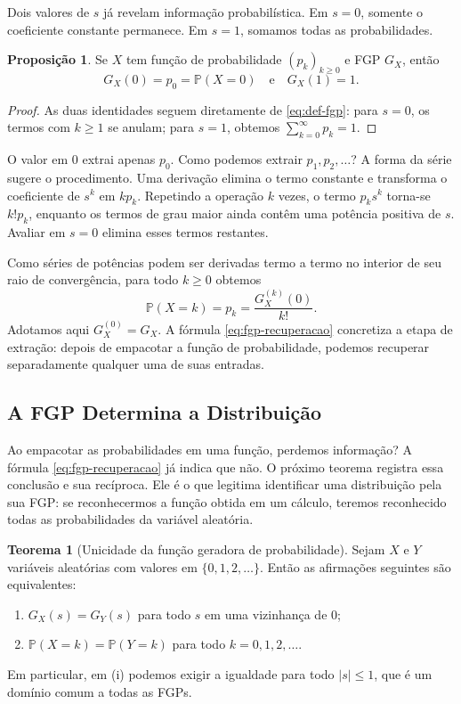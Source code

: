 \documentclass[12pt,portuguese]{article}
\theoremstyle{definition}
\newtheorem{theorem}{Teorema}
\newtheorem{proposition}[proposition]{Proposição}
\theoremstyle{plainexercise}
\theoremstyle{starredexercise}
\theoremstyle{definition}
\begin{document}
Dois valores de $s$ já revelam informação probabilística. Em $s=0$, somente
o coeficiente constante permanece. Em $s=1$, somamos todas as probabilidades.

\begin{proposition}\label{prop:propriedades-basicas-fgp}
Se $X$ tem função de probabilidade $(p_k)_{k\geqslant 0}$ e FGP $G_X$, então
\[
G_X(0)=p_0=\mathbb{P}(X=0)
\quad\text{e}\quad
G_X(1)=1.
\]
\end{proposition}

\begin{proof}
As duas identidades seguem diretamente de \eqref{eq:def-fgp}: para $s=0$,
os termos com $k\geqslant 1$ se anulam; para $s=1$, obtemos
$\sum_{k=0}^{\infty}p_k=1$.
\end{proof}

O valor em $0$ extrai apenas $p_0$. Como podemos extrair $p_1,p_2,\ldots$?
A forma da série sugere o procedimento. Uma derivação elimina o termo
constante e transforma o coeficiente de $s^k$ em $k p_k$. Repetindo a
operação $k$ vezes, o termo $p_k s^k$ torna-se $k!p_k$, enquanto os termos de
grau maior ainda contêm uma potência positiva de $s$. Avaliar em $s=0$
elimina esses termos restantes.

Como séries de potências podem ser derivadas termo a termo no interior de seu
raio de convergência, para todo $k\geqslant 0$ obtemos
\begin{equation}
\label{eq:fgp-recuperacao}
\mathbb{P}(X=k)=p_k=\frac{G_X^{(k)}(0)}{k!}.
\end{equation}
Adotamos aqui $G_X^{(0)}=G_X$. A fórmula \eqref{eq:fgp-recuperacao}
concretiza a etapa de extração: depois de empacotar a função de probabilidade,
podemos recuperar separadamente qualquer uma de suas entradas.

\subsection{A FGP Determina a Distribuição}
\label{sec:fgp-unicidade}

Ao empacotar as probabilidades em uma função, perdemos informação? A fórmula
\eqref{eq:fgp-recuperacao} já indica que não. O próximo teorema registra essa
conclusão e sua recíproca. Ele é o que legitima identificar uma distribuição
pela sua FGP: se reconhecermos a função obtida em um cálculo, teremos
reconhecido todas as probabilidades da variável aleatória.

\begin{theorem}[Unicidade da função geradora de probabilidade]\label{thm:unicidade-fgp}
Sejam $X$ e $Y$ variáveis aleatórias com valores em
$\{0,1,2,\ldots\}$. Então as afirmações seguintes são equivalentes:
\begin{enumerate}[label=(\roman*)]
\item $G_X(s)=G_Y(s)$ para todo $s$ em uma vizinhança de $0$;
\item $\mathbb{P}(X=k)=\mathbb{P}(Y=k)$ para todo
$k=0,1,2,\ldots$.
\end{enumerate}
Em particular, em (i) podemos exigir a igualdade para todo $|s|\leqslant 1$,
que é um domínio comum a todas as FGPs.
\end{theorem}
\end{document}
